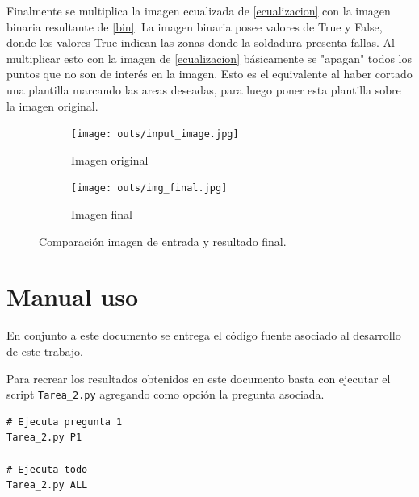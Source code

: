 \documentclass[
  letterpaper,
  twocolumn,
  9pt,
  journal,
  final]{IEEEtran}
\begin{document}
Finalmente se multiplica la imagen ecualizada de \ref{ecualizacion} con la imagen binaria resultante de \ref{bin}. La imagen binaria posee valores de True y False, donde los valores True indican las zonas donde la soldadura presenta fallas. Al multiplicar esto con la imagen de \ref{ecualizacion} básicamente se "apagan" todos los puntos que no son de interés en la imagen. Esto es el equivalente al haber cortado una plantilla marcando las areas deseadas, para luego poner esta plantilla sobre la imagen original.

\begin{figure}[!tbh]
\centering
\begin{subfigure}[b]{\columnwidth}
   \texttt{[image: outs/input\_image.jpg]}
   \caption{Imagen original}
   \label{fig:Ng1}
\end{subfigure}

\begin{subfigure}[b]{\columnwidth}
   \texttt{[image: outs/img\_final.jpg]}
   \caption{Imagen final}
   \label{fig:Ng2}
\end{subfigure}
 \caption{Comparación imagen de entrada y resultado final.} \label{fig:img_final}
\end{figure}


\section{Manual uso}

En conjunto a este documento se entrega el código fuente asociado al
desarrollo de este trabajo.

Para recrear los resultados obtenidos en este documento basta con
ejecutar el script \texttt{Tarea\_2.py} agregando como opción la
pregunta asociada.

\begin{verbatim}
# Ejecuta pregunta 1
Tarea_2.py P1

# Ejecuta todo
Tarea_2.py ALL
\end{verbatim}






\nocite{*}


\end{document}
